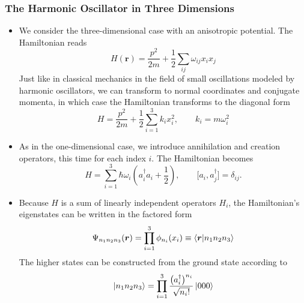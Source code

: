 \documentclass[11pt, a4paper]{article}
\newcommand{\Ham}{Hamiltonian\xspace}
\renewcommand{\vec}[1]{\bm{#1}}  %
\renewcommand{\r}{\vec{r}}  %
\renewcommand{\P}{\Psi}  %
\begin{document}
\subsubsection{The Harmonic Oscillator in Three Dimensions}
\begin{itemize}
	\item We consider the three-dimensional case with an anisotropic potential. The \Ham reads
	\begin{equation*}
		H(\r) = \frac{p^{2}}{2m} + \frac{1}{2}\sum_{ij} \omega_{ij}x_{i}x_{j}
	\end{equation*}
	Just like in classical mechanics in the field of small oscillations modeled by harmonic oscillators, we can transform to normal coordinates and conjugate momenta, in which case the \Ham transforms to the diagonal form
	\begin{equation*}
		H = \frac{p^{2}}{2m} + \frac{1}{2}\sum_{i=1}^{3}k_{i}x_{i}^{2}, \qquad k_{i} = m\omega_{i}^{2}
	\end{equation*}
	
	\item As in the one-dimensional case, we introduce annihilation and creation operators, this time for each index $ i $. The Hamiltonian becomes
	\begin{equation*}
		H = \sum_{i = 1}^{3}\hbar \omega_{i}\left(a^{\dagger}_{i}a_{i} + \frac{1}{2}\right), \qquad \big[a_{i}, a_{j}^{\dagger}\big] = \delta_{ij}.
	\end{equation*}
	
	\item Because $ H $ is a sum of linearly independent operators $ H_{i} $, the \Ham's eigenstates can be written in the factored form
	\begin{equation*}
		\P_{n_{1}n_{2}n_{3}}(\r) = \prod_{i = 1}^{3}\phi_{n_{i}}(x_{i}) \equiv \braket{\r}{n_{1}n_{2}n_{3}}
	\end{equation*}
	The higher states can be constructed from the ground state according to
	\begin{equation*}
		\ket{n_{1}n_{2}n_{3}} = \prod_{i = 1}^{3}\frac{\big(a_{i}^{\dagger}\big)^{n_{i}}}{\sqrt{n_{i}!}}\ket{000}
	\end{equation*}
\end{itemize}
\end{document}
